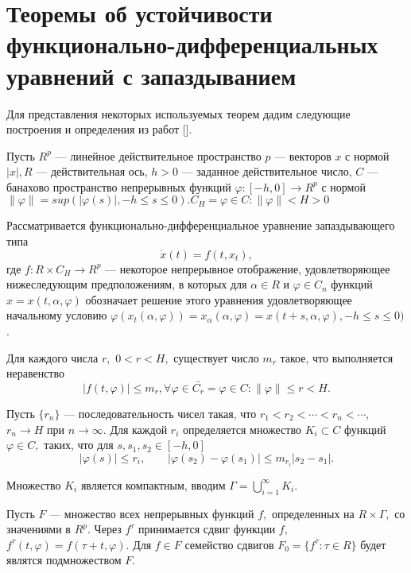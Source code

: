 \section{Теоремы об устойчивости функционально-дифференциальных уравнений с запаздыванием} \label{p11}

	
	Для представления некоторых используемых теорем дадим следующие построения и определения из работ [].

	Пусть $R^p$ --- линейное действительное пространство $p$ --- векторов $x$ с нормой $|x|,  R$ 
	--- действительная ось, $h>0$ --- заданное действительное число, $C$ --- банахово пространство
	непрерывных функций $\varphi:[-h,0] \rightarrow R^p$ с нормой $\|\varphi\|=sup(|\varphi(s)|,-h \le s \le 0). C_H = {\varphi \in C : \| \varphi \| < H > 0}$
	
	Рассматривается функционально-дифференциальное
	уравнение запаздывающего типа
	\begin{equation}
	\dot x(t) = f(t,x_t), \label{1.1'}
	\end{equation}
	где $f: R \times C_{H}\to R^p$ --- некоторое непрерывное отображение,
	удовлетворяющее  нижеследующим предположениям, в которых для $\alpha \in R$ и $\varphi \in C_n$ функций $x = x(t, \alpha, \varphi)$ обозначает решение этого уравнения удовлетворяющее начальному условию $\varphi (x_t(\alpha, \varphi)) = x_{\alpha} (\alpha, \varphi) = x(t + s, \alpha, \varphi), -h \le s \le 0)$.
	
	\begin{definition}\label{ass1} Для  каждого  числа $r,$ $0<r<H,$
		существует число $m_r$ такое, что выполняется неравенство
		\begin{equation}\label{1.2'}
		\left| f(t, \varphi) \right|\le m_r, \forall \varphi \in \bar{C_r} = {\varphi \in C: \| \varphi \| \le r < H}.
		\end{equation}
	\end{definition}
	
	Пусть $\{r_n\}$ ---
	последовательность чисел такая, что $r_1<r_2<\cdots <r_n<\cdots, $
	$r_n\to H$ при $n\to \infty .$ Для каждой $r_i$ определяется
	множество $K_i\subset C$ функций $\varphi \in C,$ таких, что
	для $s, s_1,s_2 \in [-h,0]$  $$|\varphi (s)|\le r_i, \qquad
	|\varphi (s_2)-\varphi (s_1)|\le m_{r_i} |s_2-s_1|.$$
	
	Множество $K_i$ является компактным, вводим $\Gamma =\bigcup\limits_{i=1}^{\infty } {K_i}.$
	
	Пусть $F$ --- множество всех непрерывных функций $f,$
	определенных на $R \times \Gamma,$ со значениями в $R^p.$
	Через $f^{\tau }$ принимается сдвиг функции $f,$ $f^{\tau }(t,\varphi )=f(\tau +t,\varphi ).$
	Для $f\in F$ семейство сдвигов $F_0=\{f^{\tau }:\tau\in
	R\}$ будет являтся подмножеством $F.$
	
